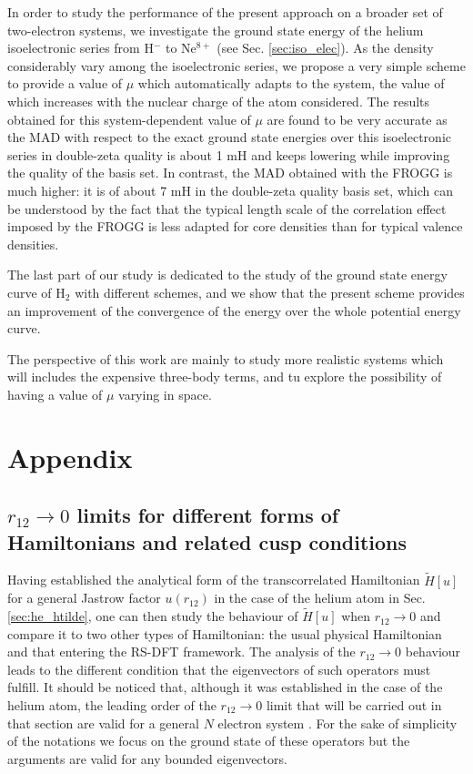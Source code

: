 \documentclass[aip,jcp,reprint,noshowkeys,superscriptaddress]{revtex4-1}
\begin{document}
In order to study the performance of the present approach on a broader set of two-electron systems, we investigate the ground state energy of the helium isoelectronic series from H$^-$ to Ne$^{8+}$ (see Sec. \ref{sec:iso_elec}). 
As the density considerably vary among the isoelectronic series, we propose a very simple scheme to provide a value of $\mu$ which automatically adapts to the system, the value of which increases with the nuclear charge of the atom considered. The results obtained for this system-dependent value of $\mu$ are found to be very accurate as the MAD with respect to the exact ground state energies over this isoelectronic series in double-zeta quality is about 1 mH and keeps lowering while improving the quality of the basis set. In contrast, the MAD obtained with the FROGG is much higher: it is of about 7 mH in the double-zeta quality basis set, which can be understood by the fact that the typical length scale of the correlation effect imposed by the FROGG is less adapted for core densities than for typical valence densities.  

The last part of our study is dedicated to the study of the ground state energy curve of H$_2$ with different schemes, and we show that the present scheme provides an improvement of the convergence of the energy over the whole potential energy curve. 

The perspective of this work are mainly to study more realistic systems which will includes the expensive three-body terms, and tu explore the possibility of having a value of $\mu$ varying in space. 


\section{Appendix}
\subsection{$r_{12} \rightarrow 0$ limits for different forms of Hamiltonians and related cusp conditions}
\label{sec:cusp}
Having established the analytical form of the transcorrelated Hamiltonian $\tilde{H}[u]$ for a general Jastrow factor $u(r_{12})$ in the case of the helium atom in Sec. \ref{sec:he_htilde}, one can then study the behaviour of $\tilde{H}[u]$ when $r_{12}\rightarrow 0$ and compare it to two other types of Hamiltonian: the usual physical Hamiltonian and that entering the RS-DFT framework. 
The analysis of the $r_{12}\rightarrow 0$ behaviour leads to the different condition that the eigenvectors of such operators must fulfill. 
It should be noticed that, although it was established in the case of the helium atom, the leading order of the $r_{12} \rightarrow 0$ limit that will be carried out in that section are valid for a general $N$ electron system . 
For the sake of simplicity of the notations we focus on the ground state of these operators but the arguments are valid for any bounded eigenvectors. 
\end{document}
